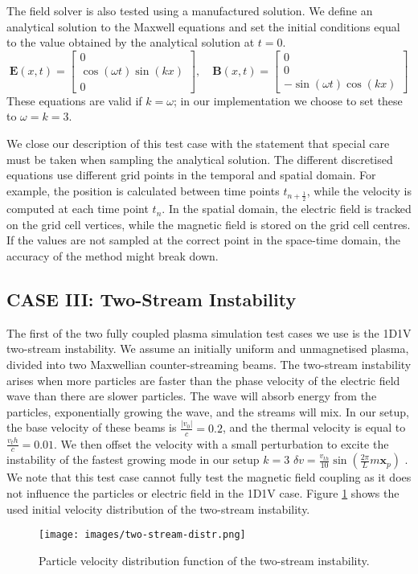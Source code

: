 The field solver is also tested using a manufactured solution. We define an analytical solution to the Maxwell equations and set the initial conditions equal to the value obtained by the analytical solution at $t=0$.
\[    \textbf{E}(x,t) = \left[\begin{matrix}
    0\\
    \cos(\omega t)\sin(k x)\\
    0
    \end{matrix}\right], \quad \textbf{B}(x,t) = \left[\begin{matrix}
    0\\
    0\\
    -\sin(\omega t)\cos(k x)
    \end{matrix}\right]
\]
These equations are valid if $k = \omega$; in our implementation we choose to set these to $\omega = k = 3$.

We close our description of this test case with the statement that special care must be taken when sampling the analytical solution. The different discretised equations use different grid points in the temporal and spatial domain. For example, the position is calculated between time points $t_{n+\frac{1}{2}}$, while the velocity is computed at each time point $t_n$. In the spatial domain, the electric field is tracked on the grid cell vertices, while the magnetic field is stored on the grid cell centres. If the values are not sampled at the correct point in the space-time domain, the accuracy of the method might break down.


\subsection{CASE III: Two-Stream Instability}
The first of the two fully coupled plasma simulation test cases we use is the 1D1V two-stream instability. We assume an initially uniform and unmagnetised plasma, divided into two Maxwellian counter-streaming beams. The two-stream instability arises when more particles are faster than the phase velocity of the electric field wave than there are slower particles. The wave will absorb energy from the particles, exponentially growing the wave, and the streams will mix. In our setup, the base velocity of these beams is $\frac{|v_0|}{c} = 0.2$, and the thermal velocity is equal to $\frac{v_th}{c} = 0.01$. We then offset the velocity with a small perturbation to excite the instability of the fastest growing mode in our setup $k = 3$
$\delta v = \frac{v_{th}}{10}\sin(\frac{2\pi}{L} m \textbf{x}_p)$
\cite{chen_introduction_1984}. We note that this test case cannot fully test the magnetic field coupling as it does not influence the particles or electric field in the 1D1V case. Figure \ref{fig: two-stream instability} shows the used initial velocity distribution of the two-stream instability.
\begin{figure}
    \centering
    \texttt{[image: images/two-stream-distr.png]}
    \caption{Particle velocity distribution function of the two-stream instability.}
    \label{fig: two-stream instability}
\end{figure}

